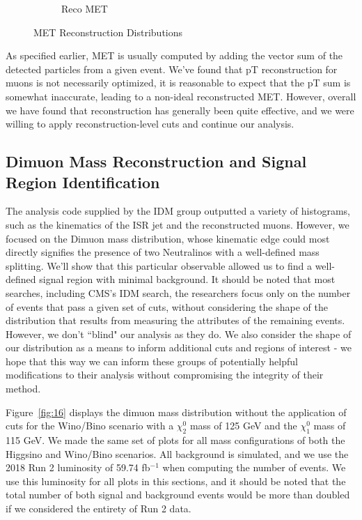 \documentclass{article}
\begin{document}
\begin{figure}
\begin{subfigure}[b]{.3\textwidth}
  \caption{Reco MET}
  \label{fig:sub-fourthgen}
\end{subfigure}
\caption{MET Reconstruction Distributions}
\label{fig:15}
\end{figure}
As specified earlier, MET is usually computed by adding the vector sum of the detected particles from a given event. We've found that pT reconstruction for muons is not necessarily optimized, it is reasonable to expect that the pT sum is somewhat inaccurate, leading to a non-ideal reconstructed MET. However, overall we have found that reconstruction has generally been quite effective, and we were willing to apply reconstruction-level cuts and continue our analysis.
\subsection{Dimuon Mass Reconstruction and Signal Region Identification}
The analysis code supplied by the IDM group outputted a variety of histograms, such as the kinematics of the ISR jet and the reconstructed muons. However, we focused on the Dimuon mass distribution, whose kinematic edge could most directly signifies the presence of two Neutralinos with a well-defined mass splitting. We'll show that this particular observable allowed us to find a well-defined signal region with minimal background. It should be noted that most searches, including CMS's IDM search, the researchers focus only on the number of events that pass a given set of cuts, without considering the shape of the distribution that results from measuring the attributes of the remaining events. However, we don't ``blind" our analysis as they do. We also consider the shape of our distribution as a means to inform additional cuts and regions of interest - we hope that this way we can inform these groups of potentially helpful modifications to their analysis without compromising the integrity of their method.
\par
Figure~\ref{fig:16} displays the dimuon mass distribution without the application of cuts for the Wino/Bino scenario with a $\chi_{2}^{0}$ mass of 125 GeV and the $\chi_{1}^{0}$ mass of 115 GeV. We made the same set of plots for all mass configurations of both the Higgsino and Wino/Bino scenarios. All background is simulated, and we use the 2018 Run 2 luminosity of 59.74 fb$^{-1}$ when computing the number of events. We use this luminosity for all plots in this sections, and it should be noted that the total number of both signal and background events would be more than doubled if we considered the entirety of Run 2 data. 
\end{document}
